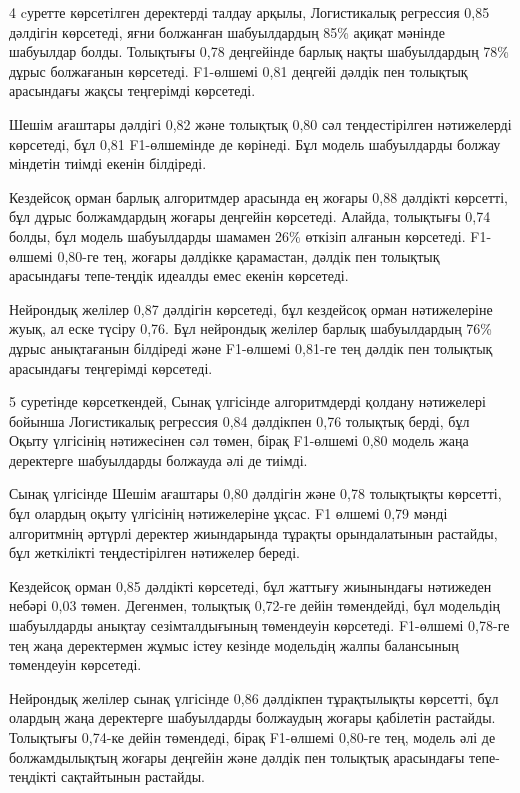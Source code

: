 \begin{multicols}{2}
4 cуретте көрсетілген деректерді талдау арқылы, Логистикалық регрессия
0,85 дәлдігін көрсетеді, яғни болжанған шабуылдардың 85\% ақиқат мәнінде
шабуылдар болды. Толықтығы 0,78 деңгейінде барлық нақты шабуылдардың
78\% дұрыс болжағанын көрсетеді. F1-өлшемі 0,81 деңгейі дәлдік пен
толықтық арасындағы жақсы теңгерімді көрсетеді.

Шешім ағаштары дәлдігі 0,82 және толықтық 0,80 сәл теңдестірілген
нәтижелерді көрсетеді, бұл 0,81 F1-өлшемінде де көрінеді. Бұл модель
шабуылдарды болжау міндетін тиімді екенін білдіреді.

Кездейсоқ орман барлық алгоритмдер арасында ең жоғары 0,88 дәлдікті
көрсетті, бұл дұрыс болжамдардың жоғары деңгейін көрсетеді. Алайда,
толықтығы 0,74 болды, бұл модель шабуылдарды шамамен 26\% өткізіп
алғанын көрсетеді. F1-өлшемі 0,80-ге тең, жоғары дәлдікке қарамастан,
дәлдік пен толықтық арасындағы тепе-теңдік идеалды емес екенін
көрсетеді.

Нейрондық желілер 0,87 дәлдігін көрсетеді, бұл кездейсоқ орман
нәтижелеріне жуық, ал еске түсіру 0,76. Бұл нейрондық желілер барлық
шабуылдардың 76\% дұрыс анықтағанын білдіреді және F1-өлшемі 0,81-ге тең
дәлдік пен толықтық арасындағы теңгерімді көрсетеді.

5 суретінде көрсеткендей, Сынақ үлгісінде алгоритмдерді қолдану
нәтижелері бойынша Логистикалық регрессия 0,84 дәлдікпен 0,76 толықтық
берді, бұл Оқыту үлгісінің нәтижесінен сәл төмен, бірақ F1-өлшемі 0,80
модель жаңа деректерге шабуылдарды болжауда әлі де тиімді.

Сынақ үлгісінде Шешім ағаштары 0,80 дәлдігін және 0,78 толықтықты
көрсетті, бұл олардың оқыту үлгісінің нәтижелеріне ұқсас. F1 өлшемі 0,79
мәнді алгоритмнің әртүрлі деректер жиындарында тұрақты орындалатынын
растайды, бұл жеткілікті теңдестірілген нәтижелер береді.

Кездейсоқ орман 0,85 дәлдікті көрсетеді, бұл жаттығу жиынындағы
нәтижеден небәрі 0,03 төмен. Дегенмен, толықтық 0,72-ге дейін
төмендейді, бұл модельдің шабуылдарды анықтау сезімталдығының төмендеуін
көрсетеді. F1-өлшемі 0,78-ге тең жаңа деректермен жұмыс істеу кезінде
модельдің жалпы балансының төмендеуін көрсетеді.

Нейрондық желілер сынақ үлгісінде 0,86 дәлдікпен тұрақтылықты көрсетті,
бұл олардың жаңа деректерге шабуылдарды болжаудың жоғары қабілетін
растайды. Толықтығы 0,74-ке дейін төмендеді, бірақ F1-өлшемі 0,80-ге
тең, модель әлі де болжамдылықтың жоғары деңгейін және дәлдік пен
толықтық арасындағы тепе-теңдікті сақтайтынын растайды.


\end{multicols}
